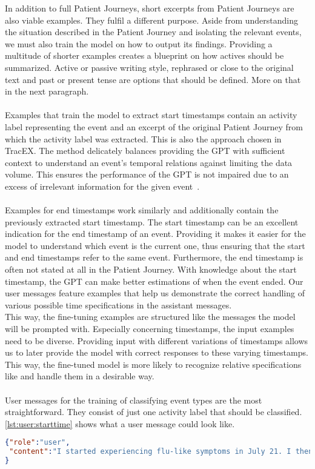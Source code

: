 In addition to full Patient Journeys, short excerpts from Patient Journeys are also viable examples. They fulfil a different purpose. Aside from understanding the situation described in the Patient Journey and isolating the relevant events, we must also train the model on how to output its findings. Providing a multitude of shorter examples creates a blueprint on how actives should be summarized. Active or passive writing style, rephrased or close to the original text and past or present tense are options that should be defined. More on that in the next paragraph.\\\\
Examples that train the model to extract start timestamps contain an activity label representing the event and an excerpt of the original Patient Journey from which the activity label was extracted. This is also the approach chosen in TracEX. The method delicately balances providing the GPT with sufficient context to understand an event's temporal relations against limiting the data volume. This ensures the performance of the GPT is not impaired due to an excess of irrelevant information for the given event~\cite{han_is_2023}.\\\\
Examples for end timestamps work similarly and additionally contain the previously extracted start timestamp. The start timestamp can be an excellent indication for the end timestamp of an event. Providing it makes it easier for the model to understand which event is the current one, thus ensuring that the start and end timestamps refer to the same event. Furthermore, the end timestamp is often not stated at all in the Patient Journey. With knowledge about the start timestamp, the GPT can make better estimations of when the event ended. Our user messages feature examples that help us demonstrate the correct handling of various possible time specifications in the assistant messages.\\
This way, the fine-tuning examples are structured like the messages the model will be prompted with. Especially concerning timestamps, the input examples need to be diverse. Providing input with different variations of timestamps allows us to later provide the model with correct responses to these varying timestamps. This way, the fine-tuned model is more likely to recognize relative specifications like  and handle them in a desirable way. \\\\
User messages for the training of classifying event types are the most straightforward. They consist of just one activity label that should be classified.\\
\autoref{lst:user:starttime} shows what a user message could look like.
\begin{lstlisting}[language=json, caption={User message for determining an activities start timestamp}, label={lst:user:starttime}]
{"role":"user",
 "content":"I started experiencing flu-like symptoms in July 21. I then got tested positive for Covid19. In October, I got infected again. Then on the 4th of November I got my first dosage of the vaccine. I had heavy side effects.\n Activity Label: starting to experience symptoms"
}
\end{lstlisting}

